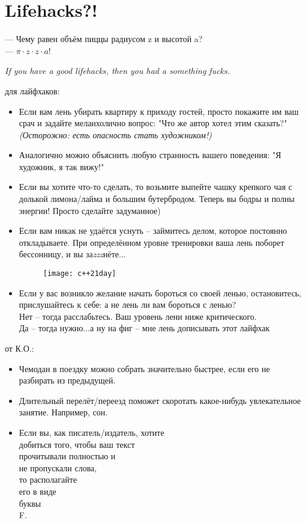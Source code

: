 \section{Lifehacks?!}
\begin{epigraph}
    --- Чему равен объём пиццы радиусом z и высотой a?\\
    --- \( \pi\cdot z\cdot z\cdot a \)!
\end{epigraph}

\noindent\emph{If you have a good lifehacks, then you had a something fucks.}

 для лайфхаков:
\begin{itemize}
    \item Если вам лень убирать квартиру к приходу гостей, просто покажите им ваш срач и задайте меланхолично вопрос: "Что же автор хотел этим сказать?" \emph{(Осторожно: есть опасность стать художником!)}
    \item Аналогично можно объяснить любую странность вашего поведения: "Я художник, я так вижу!"
    \item Если вы хотите что-то сделать, то возьмите выпейте чашку крепкого чая с долькой лимона/лайма и большим бутербродом. Теперь вы бодры и полны энергии! Просто сделайте задуманное)
    \item Если вам никак не удаётся уснуть -- займитесь делом, которое постоянно откладываете. При определённом уровне тренировки ваша лень поборет бессонницу, и вы за\emph{zzz}нёте...
    \begin{figure}[ht!]
        \centering
        \texttt{[image: c++21day]}
    \end{figure}
    \item Если у вас возникло желание начать бороться со своей ленью, остановитесь, прислушайтесь к себе: а не лень ли вам бороться с ленью?\\
        Нет -- тогда расслабьтесь. Ваш уровень лени ниже критического.\\
        Да -- тогда нужно...а ну на фиг -- мне лень дописывать этот лайфхак
\end{itemize}

\newpage

 от К.О.:
\begin{itemize}
    \item Чемодан в поездку можно собрать значительно быстрее, если его не разбирать из предыдущей.
    \item Длительный перелёт/переезд поможет скоротать какое-нибудь увлекательное занятие. Например, сон.
    \item Если вы, как писатель/издатель, хотите \\ добиться того, чтобы ваш текст \\
        прочитывали полностью и \\
        не пропускали слова, \\
        то располагайте \\
        его в виде \\
        буквы \\
        F.
\end{itemize}
